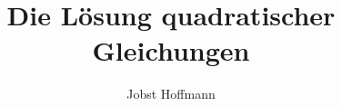 \pagestyle{scrheadings}         %
\ifoot{\usebox{\NameAndDate}}   %

\usepackage{ifthen}             %
\usepackage{xcolor}             %

\usepackage{varioref}           %
\usepackage[ngerman]{cleveref}  %
\usepackage{babel}
\usepackage{url}
\usepackage{titling}
\usepackage{graphicx}
\usepackage{xcolor}
\usepackage{eso-pic,lipsum}
\usepackage{lmodern}
\usepackage{algorithm}
\usepackage{algpseudocode}
\usepackage{tabularx}
\usepackage{tikz}

\usepackage{subcaption}

\usepackage{float}
\usepackage{enumerate}
\usepackage{chemformula}
\usepackage{cleveref}
\setcounter{secnumdepth}{7}     %
\setcounter{tocdepth}{7}        %
\newlength{\myWidth}            %

\author{Jobst Hoffmann}
\title{Die Lösung quadratischer Gleichungen}       %



